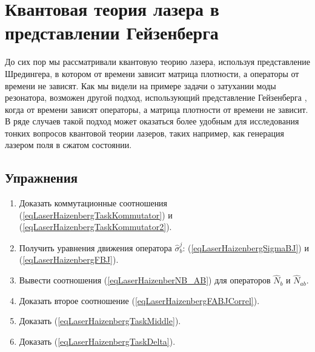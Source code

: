 \chapter{Квантовая теория лазера в представлении Гейзенберга}
\label{chLaser2}

До сих пор мы рассматривали квантовую теорию лазера, используя
представление Шредингера, в котором от времени зависит матрица
плотности, а операторы от времени не зависят. Как мы видели на примере
задачи о затухании моды резонатора, возможен другой подход,
использующий представление Гейзенберга
\cite{bScullyQuantumOptics2003}, 
когда от времени зависят
операторы, а матрица плотности от времени не зависит. В ряде случаев
такой подход может оказаться более удобным для исследования тонких
вопросов квантовой теории лазеров, таких например, как генерация
лазером поля в сжатом состоянии. 






\section{Упражнения}
\begin{enumerate}
\item Доказать коммутационные соотношения
  (\ref{eqLaserHaizenbergTaskKommutator}) и (\ref{eqLaserHaizenbergTaskKommutator2}).
\item Получить уравнения движения оператора $\hat{\sigma}_b^j$: (\ref{eqLaserHaizenbergSigmaBJ}) и 
(\ref{eqLaserHaizenbergFBJ}).
\item Вывести соотношения (\ref{eqLaserHaizenberNB_AB}) для
  операторов $\hat{N}_b$ и $\hat{N}_{ab}$.
\item Доказать второе соотношение (\ref{eqLaserHaizenbergFABJCorrel}).
\item Доказать (\ref{eqLaserHaizenbergTaskMiddle}).
\item Доказать (\ref{eqLaserHaizenbergTaskDelta}).
\end{enumerate}

